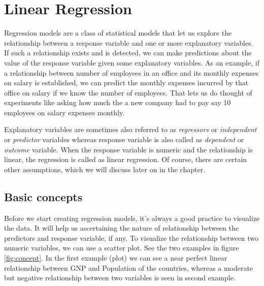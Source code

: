 \documentclass[
]{book}
\begin{document}
\hypertarget{linear-regression}{%
\chapter{Linear Regression}\label{linear-regression}}

Regression models are a class of statistical models that let us explore the relationship between a response variable and one or more explanatory variables. If such a relationship exists and is detected, we can make predictions about the value of the response variable given some explanatory variables. As an example, if a relationship between number of employees in an office and its monthly expenses on salary is established, we can predict the monthly expenses incurred by that office on salary if we know the number of employees. That lets us do thought of experiments like asking how much the a new company had to pay say 10 employees on salary expenses monthly.

Explanatory variables are sometimes also referred to as \emph{regressors} or \emph{independent} or \emph{predictor} variables whereas response variable is also called as \emph{dependent} or \emph{outcome} variable. When the response variable is numeric and the relationship is linear, the regression is called as linear regression. Of course, there are certain other assumptions, which we will discuss later on in the chapter.

\hypertarget{basic-concepts-1}{%
\section{Basic concepts}\label{basic-concepts-1}}

Before we start creating regression models, it's always a good practice to visualize the data. It will help us ascertaining the nature of relationship between the predictors and response variable, if any. To visualize the relationship between two numeric variables, we can use a scatter plot. See the two examples in figure \ref{fig:concept}. In the first example (plot) we can see a near perfect linear relationship between GNP and Population of the countries, whereas a moderate but negative relationship between two variables is seen in second example.
\end{document}
